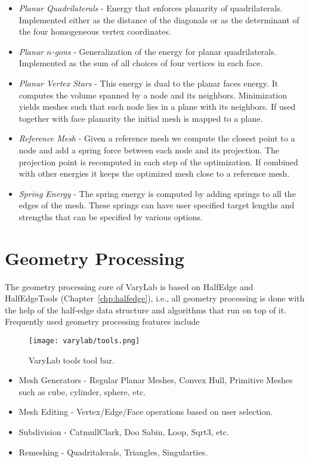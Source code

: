 \documentclass[Thesis.tex]{subfiles}
\begin{document}
\begin{itemize}
\item \emph{Planar Quadrilaterals} - Energy that enforces planarity of quadrilaterals. Implemented either as the distance of the diagonals or as the determinant of the four homogeneous vertex coordinates.
\item \emph{Planar $n$-gons} - Generalization of the energy for planar quadrilaterals. Implemented as the sum of all choices of four vertices in each face.
\item \emph{Planar Vertex Stars} - This energy is dual to the planar faces energy. It computes the volume spanned by a node and its neighbors. Minimization yields meshes such that each node lies in a plane with its neighbors. If used together with face planarity the initial mesh is mapped to a plane.
\item \emph{Reference Mesh} - Given a reference mesh we compute the closest point to a node and add a spring force between each node and its projection. The projection point is recomputed in each step of the optimization. If combined with other energies it keeps the optimized mesh close to a reference mesh.
\item \emph{Spring Energy} - The spring energy is computed by adding springs to all the edges of the mesh. These springs can have user specified target lengths and strengths that can be specified by various options.
\end{itemize}

\section{Geometry Processing}

The geometry processing core of {\sc VaryLab} is based on {\sc HalfEdge} and {\sc HalfEdgeTools} (Chapter~\ref{chp:halfedge}), i.e., all geometry processing is done with the help of the half-edge data structure and algorithms that run on top of it. Frequently used geometry processing features include

\begin{figure}
    \begin{center}
    \texttt{[image: varylab/tools.png]}
    \caption{{\sc VaryLab} tools tool bar.}
    \label{fig:varylab_tools_ui}
    \end{center}
\end{figure}

\begin{itemize}
\item Mesh Generators - Regular Planar Meshes, Convex Hull, Primitive Meshes such as cube, cylinder, sphere, etc.
\item Mesh Editing - Vertex/Edge/Face operations based on user selection.
\item Subdivision - CatmullClark, Doo Sabin, Loop, Sqrt3, etc.
\item Remeshing - Quadritalerals, Triangles, Singularties.
\end{itemize}
\end{document}
